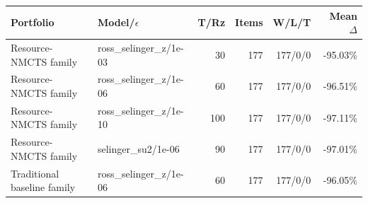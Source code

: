 \begin{tabular}{llrrrr}
\toprule
Portfolio & Model/$\epsilon$ & T/Rz & Items & W/L/T & Mean $\Delta$ \\
\midrule
Resource-NMCTS family & ross\_selinger\_z/1e-03 & 30 & 177 & 177/0/0 & -95.03\% \\
Resource-NMCTS family & ross\_selinger\_z/1e-06 & 60 & 177 & 177/0/0 & -96.51\% \\
Resource-NMCTS family & ross\_selinger\_z/1e-10 & 100 & 177 & 177/0/0 & -97.11\% \\
Resource-NMCTS family & selinger\_su2/1e-06 & 90 & 177 & 177/0/0 & -97.01\% \\
Traditional baseline family & ross\_selinger\_z/1e-06 & 60 & 177 & 177/0/0 & -96.05\% \\
\bottomrule
\end{tabular}
